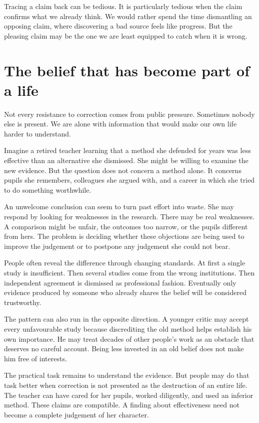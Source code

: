 \documentclass[12pt,a4paper]{book}
\begin{document}
Tracing a claim back can be tedious. It is particularly tedious when the claim confirms what we already think. We would rather spend the time dismantling an opposing claim, where discovering a bad source feels like progress. But the pleasing claim may be the one we are least equipped to catch when it is wrong.

\section*{The belief that has become part of a life}

Not every resistance to correction comes from public pressure. Sometimes nobody else is present. We are alone with information that would make our own life harder to understand.

Imagine a retired teacher learning that a method she defended for years was less effective than an alternative she dismissed. She might be willing to examine the new evidence. But the question does not concern a method alone. It concerns pupils she remembers, colleagues she argued with, and a career in which she tried to do something worthwhile.

An unwelcome conclusion can seem to turn past effort into waste. She may respond by looking for weaknesses in the research. There may be real weaknesses. A comparison might be unfair, the outcomes too narrow, or the pupils different from hers. The problem is deciding whether these objections are being used to improve the judgement or to postpone any judgement she could not bear.

People often reveal the difference through changing standards. At first a single study is insufficient. Then several studies come from the wrong institutions. Then independent agreement is dismissed as professional fashion. Eventually only evidence produced by someone who already shares the belief will be considered trustworthy.

The pattern can also run in the opposite direction. A younger critic may accept every unfavourable study because discrediting the old method helps establish his own importance. He may treat decades of other people's work as an obstacle that deserves no careful account. Being less invested in an old belief does not make him free of interests.

The practical task remains to understand the evidence. But people may do that task better when correction is not presented as the destruction of an entire life. The teacher can have cared for her pupils, worked diligently, and used an inferior method. These claims are compatible. A finding about effectiveness need not become a complete judgement of her character.
\end{document}
